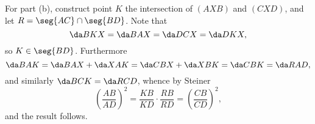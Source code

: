 For part (b), construct point $K$ the intersection of $(AXB)$ and $(CXD)$, and let $R=\seg{AC}\cap\seg{BD}$. Note that \[\da BKX=\da BAX=\da DCX=\da DKX,\]
so $K\in\seg{BD}$. Furthermore \[\da BAK=\da BAX+\da XAK=\da CBX+\da XBK=\da CBK=\da RAD,\]
and similarly $\da BCK=\da RCD$, whence by Steiner \[\left(\frac{AB}{AD}\right)^2=\frac{KB}{KD}\cdot\frac{RB}{RD}=\left(\frac{CB}{CD}\right)^2,\]
and the result follows.

